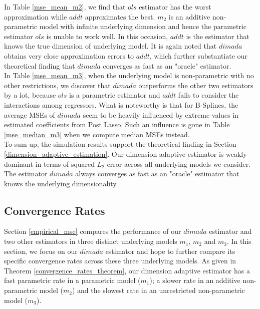 \documentclass[12pt, a4paper]{article}
\theoremstyle{MAstyle} \newtheorem{assumption}{Assumption}[section]
\theoremstyle{MAstyle} \newtheorem{definition}{Definition}[section]
\theoremstyle{MAstyle} \newtheorem{theorem}{Theorem}[section]
\theoremstyle{MAstyle} \newtheorem{corollary}{Corollary}[section]
\begin{document}
                In Table \ref{mse_mean_m2}, we find that $ols$ estimator has the worst approximation while $addt$ approximates the best. $m_2$ is an additive non-parametric model with infinite underlying dimension and hence the parametric estimator $ols$ is unable to work well. In this occasion, $addt$ is the estimator that knows the true dimension of underlying model. It is again noted that $dimada$ obtains very close approximation errors to $addt$, which further substantiate our theoretical finding that $dimada$ converges as fast as an "oracle" estimator.\\

                In Table \ref{mse_mean_m3}, when the underlying model is non-parametric with no other restrictions, we discover that $dimada$ outperforms the other two estimators by a lot, because $ols$ is a parametric estimator and $addt$ fails to consider the interactions among regressors. What is noteworthy is that for B-Splines, the average MSEs of $dimada$ seem to be heavily influenced by extreme values in estimated coefficients from Post Lasso. Such an influence is gone in Table \ref{mse_median_m3} when we compute median MSEs instead.\\

                To sum up, the simulation results support the theoretical finding in Section \ref{dimension_adaptive_estimation}. Our dimension adaptive estimator is weakly dominant in terms of squared $L_2$ error across all underlying models we consider. The estimator $dimada$ always converges as fast as an "oracle" estimator that knows the underlying dimensionality. 

            \subsection{Convergence Rates}\label{convergence_rate_sim}
                Section \ref{empirical_mse} compares the performance of our $dimada$ estimator and two other estimators in three distinct underlying models $m_1$, $m_2$ and $m_3$. In this section, we focus on our $dimada$ estimator and hope to further compare its specific convergence rates across these three underlying models. As given in Theorem \ref{convergence_rates_theorem}, our dimension adaptive estimator has a fast parametric rate in a parametric model ($m_1$); a slower rate in an additive non-parametric model ($m_2$) and the slowest rate in an unrestricted non-parametric model ($m_3$).\\
\end{document}
